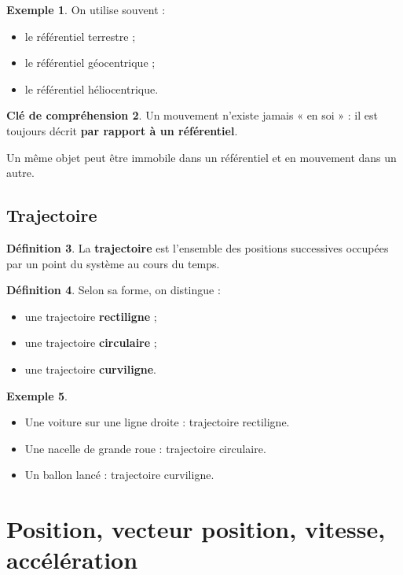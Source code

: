 \documentclass[11pt,a4paper]{article}
\theoremstyle{definition}
\newtheorem{definition}{Définition}[section]
\newtheorem{exemple}[definition]{Exemple}
\newtheorem{interpretation}[definition]{Clé de compréhension}
\theoremstyle{plain}
\theoremstyle{remark}
\begin{document}
\begin{exemple}
On utilise souvent :
\begin{itemize}
    \item le référentiel terrestre ;
    \item le référentiel géocentrique ;
    \item le référentiel héliocentrique.
\end{itemize}
\end{exemple}

\begin{interpretation}
Un mouvement n'existe jamais « en soi » : il est toujours décrit \textbf{par rapport à un référentiel}.  

Un même objet peut être immobile dans un référentiel et en mouvement dans un autre.
\end{interpretation}

\subsection{Trajectoire}

\begin{definition}
La \textbf{trajectoire} est l'ensemble des positions successives occupées par un point du système au cours du temps.
\end{definition}

\begin{definition}
Selon sa forme, on distingue :
\begin{itemize}
    \item une trajectoire \textbf{rectiligne} ;
    \item une trajectoire \textbf{circulaire} ;
    \item une trajectoire \textbf{curviligne}.
\end{itemize}
\end{definition}

\begin{exemple}
\begin{itemize}
    \item Une voiture sur une ligne droite : trajectoire rectiligne.
    \item Une nacelle de grande roue : trajectoire circulaire.
    \item Un ballon lancé : trajectoire curviligne.
\end{itemize}
\end{exemple}

\section{Position, vecteur position, vitesse, accélération}
\end{document}
